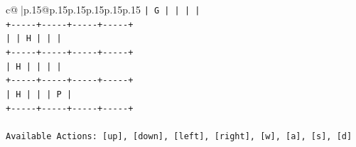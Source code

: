 \documentclass{article}
\begin{document}
{\begin{supertabular}{c@{$\;$}|p{.15\linewidth}@{}p{.15\linewidth}p{.15\linewidth}p{.15\linewidth}p{.15\linewidth}p{.15\linewidth}}
{{{\texttt{|  G  |     |     |     |} \\
\texttt{+{-}{-}{-}{-}{-}+{-}{-}{-}{-}{-}+{-}{-}{-}{-}{-}+{-}{-}{-}{-}{-}+} \\
\texttt{|     |  H  |     |     |} \\
\texttt{+{-}{-}{-}{-}{-}+{-}{-}{-}{-}{-}+{-}{-}{-}{-}{-}+{-}{-}{-}{-}{-}+} \\
\texttt{|  H  |     |     |     |} \\
\texttt{+{-}{-}{-}{-}{-}+{-}{-}{-}{-}{-}+{-}{-}{-}{-}{-}+{-}{-}{-}{-}{-}+} \\
\texttt{|  H  |     |     |  P  |} \\
\texttt{+{-}{-}{-}{-}{-}+{-}{-}{-}{-}{-}+{-}{-}{-}{-}{-}+{-}{-}{-}{-}{-}+} \\
\\ 
\texttt{Available Actions: {[}up{]}, {[}down{]}, {[}left{]}, {[}right{]}, {[}w{]}, {[}a{]}, {[}s{]}, {[}d{]}} \\
            }
        }
    }
     \\ \\


\end{supertabular}}
\end{document}
